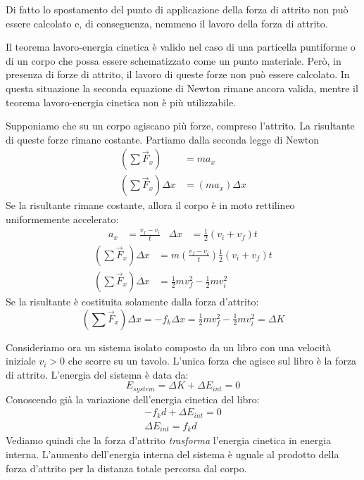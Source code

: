 \documentclass[a4paper,11pt,oneside]{book}
\begin{document}
Di fatto lo spostamento del punto di applicazione della forza di attrito non può essere calcolato e, di conseguenza, nemmeno il lavoro della forza di attrito.

Il teorema lavoro-energia cinetica è valido nel caso di una particella puntiforme o di un corpo che possa essere schematizzato come un punto materiale. Però, in presenza di forze di attrito, il lavoro di queste forze non può essere calcolato. In questa situazione la seconda equazione di Newton rimane ancora valida, mentre il teorema lavoro-energia cinetica non è più utilizzabile.

Supponiamo che su un corpo agiscano più forze, compreso l'attrito. La risultante di queste forze rimane costante. Partiamo dalla seconda legge di Newton
\begin{align*}
    \left(\sum \vec{F}_x \right) &= ma_x \\
    \left(\sum \vec{F}_x \right) \Delta x &= (ma_x) \Delta x
\end{align*}
Se la risultante rimane costante, allora il corpo è in moto rettilineo uniformemente accelerato:
\begin{align*}
    a_x &= \frac{v_f - v_i}{t} & \Delta x &= \tfrac{1}{2}(v_i + v_f)t
\end{align*}
\begin{align*}
    \left(\sum \vec{F}_x \right) \Delta x &= m \left(\frac{v_f - v_i}{t} \right)\tfrac{1}{2}(v_i+v_f)t \\
    \left(\sum \vec{F}_x \right) \Delta x &= \tfrac{1}{2}mv_f^2 - \tfrac{1}{2} mv_i^2
\end{align*}
Se la risultante è costituita solamente dalla forza d'attrito:
\begin{equation*}
    \left(\sum \vec{F}_x \right) \Delta x = -f_k \Delta x = \tfrac{1}{2}mv_f^2 - \tfrac{1}{2} mv_i^2 = \Delta K
\end{equation*}

Consideriamo ora un sistema isolato composto da un libro con una velocità iniziale $v_i>0$ che scorre su un tavolo. L'unica forza che agisce sul libro è la forza di attrito.
L'energia del sistema è data da:
\begin{equation*}
    E_{system} = \Delta K + \Delta E_{int} = 0
\end{equation*}
Conoscendo già la variazione dell'energia cinetica del libro:
\begin{align*}
    -f_kd + \Delta E_{int} = 0 \\
    \Delta E_{int} = f_kd
\end{align*}
Vediamo quindi che la forza d'attrito \emph{trasforma} l'energia cinetica in energia interna. L'aumento dell'energia interna del sistema è uguale al prodotto della forza d'attrito
per la distanza totale percorsa dal corpo.
\end{document}
